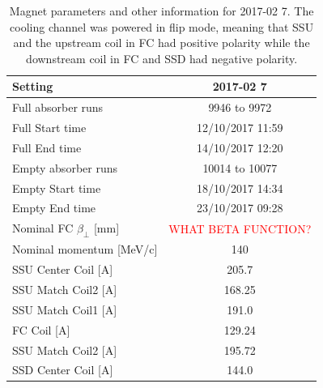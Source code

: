 \begin{table}
\centering
\caption{Magnet parameters and other information for 2017-02 7. The cooling channel was powered in 
flip mode, meaning that SSU and the upstream coil in FC had positive polarity 
while the downstream coil in FC and SSD had negative polarity.
\label{tab:magnet_parameters}}

\begin{tabular}{|l|c|}
\hline
Setting                       & 2017-02 7    \\
\hline
Full absorber runs            & 9946 to 9972 \\
Full Start time               & 12/10/2017 11:59  \\
Full End time                 & 14/10/2017 12:20  \\
Empty absorber runs           & 10014 to 10077 \\
Empty Start time              & 18/10/2017 14:34  \\
Empty End time                & 23/10/2017 09:28  \\
Nominal FC $\beta_\perp$ [mm] & \textcolor{red}{WHAT BETA FUNCTION?}  \\
Nominal momentum [MeV/c]      & 140          \\
\hline
SSU Center Coil [A]           & 205.7        \\
SSU Match Coil2 [A]           & 168.25       \\
SSU Match Coil1 [A]           & 191.0        \\
\hline
FC Coil [A]                   & 129.24       \\
\hline
SSU Match Coil2 [A]           & 195.72       \\
SSD Center Coil [A]           & 144.0        \\
\hline
\end{tabular}
\end{table}


